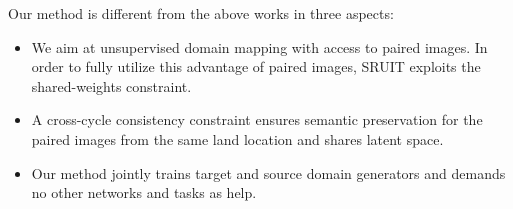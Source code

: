 Our method is different from the above works in three aspects:
\begin{itemize}
\item We aim at unsupervised domain mapping with access to paired images. In order to fully utilize this advantage of paired images, SRUIT exploits the shared-weights constraint. 
\item A cross-cycle consistency constraint ensures semantic preservation for the paired images from the same land location and shares latent space. 
\item Our method jointly trains target and source domain generators and demands no other networks and tasks as help.
\end{itemize}